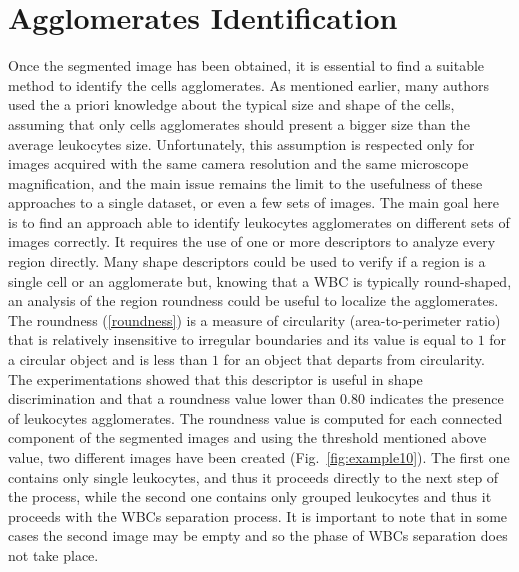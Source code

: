{	\section{Agglomerates Identification} 
	Once the segmented image has been obtained, it is essential to find a suitable method to identify the cells agglomerates. As mentioned earlier, many authors used the a priori knowledge about the typical size and shape of the cells, assuming that only cells agglomerates should present a bigger size than the average leukocytes size. Unfortunately, this assumption is respected only for images acquired with the same camera resolution and the same microscope magnification, and the main issue remains the limit to the usefulness of these approaches to a single dataset, or even a few sets of images. The main goal here is to find an approach able to identify leukocytes agglomerates on different sets of images correctly. It requires the use of one or more descriptors to analyze every region directly. Many shape descriptors could be used to verify if a region is a single cell or an agglomerate \cite{Gonz} but, knowing that a WBC is typically round-shaped, an analysis of the region roundness could be useful to localize the agglomerates. The roundness (\ref{roundness}) is a measure of circularity (area-to-perimeter ratio) that is relatively insensitive to irregular boundaries and its value is equal to $1$ for a circular object and is less than $1$ for an object that departs from circularity. The experimentations showed that this descriptor is useful in shape discrimination and that a roundness value lower than $0.80$ indicates the presence of leukocytes agglomerates. The roundness value is computed for each connected component of the segmented images and using the threshold mentioned above value, two different images have been created (Fig.~\ref{fig:example10}). The first one contains only single leukocytes, and thus it proceeds directly to the next step of the process, while the second one contains only grouped leukocytes and thus it proceeds with the WBCs separation process. It is important to note that in some cases the second image may be empty and so the phase of WBCs separation does not take place.    
	
}
